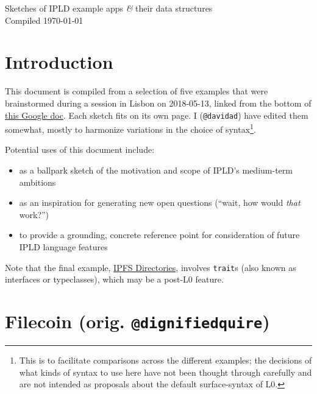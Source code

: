 \documentclass[11pt]{article}
\begin{document}
{\LARGE Sketches of IPLD example apps \textit{\&} their data structures} \\[2mm]
{\large Compiled \today}

\section{Introduction}

This document is compiled from a selection of five examples that were brainstormed during a session in Lisbon on 2018-05-13, linked from the bottom of \href{https://docs.google.com/document/d/1PIV5VjFeI_CGU8Fh0-ZaEOhV-ACa8NvZr3hPOH9eWsE/view}{this Google doc}. Each sketch fits on its own page. I (\texttt{@davidad}) have edited them somewhat, mostly to harmonize variations in the choice of syntax\footnote{This is to facilitate comparisons across the different examples; the decisions of what kinds of syntax to use here have not been thought through carefully and are not intended as proposals about the default surface-syntax of L0.}.

Potential uses of this document include: \begin{itemize}
\item as a ballpark sketch of the motivation and scope of IPLD's medium-term ambitions
\item as an inspiration for generating new open questions (``wait, how would \textit{that} work?'')
\item to provide a grounding, concrete reference point for consideration of future IPLD language features
\end{itemize}

Note that the final example, \hyperref[sec:dirs]{IPFS Directories}, involves \texttt{trait}s (also known as interfaces or typeclasses), which may be a post-L0 feature.

\newpage
\section{Filecoin (orig. \texttt{@dignifiedquire})}
\end{document}
